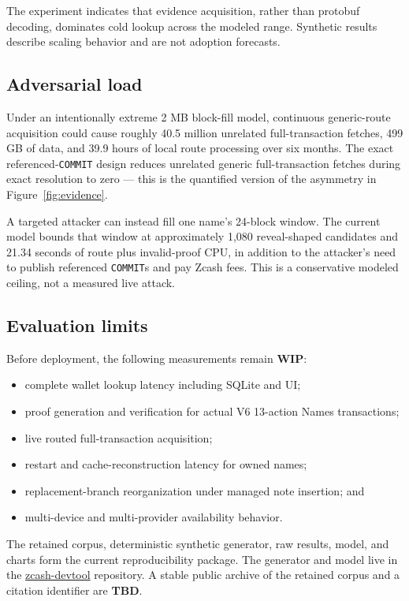 \documentclass[11pt]{article}
\newcommand{\operation}[1]{\texttt{#1}}
\newcommand{\statusword}[1]{\textbf{#1}}
\begin{document}
The experiment indicates that evidence acquisition, rather than protobuf
decoding, dominates cold lookup across the modeled range. Synthetic results
describe scaling behavior and are not adoption forecasts.

\subsection{Adversarial load}

Under an intentionally extreme 2 MB block-fill model, continuous
generic-route acquisition could cause roughly 40.5 million unrelated
full-transaction fetches, 499 GB of data, and 39.9 hours of local route
processing over six months. The exact referenced-\operation{COMMIT} design
reduces unrelated generic full-transaction fetches during exact resolution to
zero --- this is the quantified version of the asymmetry in
Figure~\ref{fig:evidence}.

A targeted attacker can instead fill one name's 24-block window. The current
model bounds that window at approximately 1,080 reveal-shaped candidates and
21.34 seconds of route plus invalid-proof CPU, in addition to the attacker's
need to publish referenced \operation{COMMIT}s and pay Zcash fees. This is a
conservative modeled ceiling, not a measured live attack.

\subsection{Evaluation limits}

Before deployment, the following measurements remain \statusword{WIP}:

\begin{itemize}
\item complete wallet lookup latency including SQLite and UI;
\item proof generation and verification for actual V6 13-action Names
transactions;
\item live routed full-transaction acquisition;
\item restart and cache-reconstruction latency for owned names;
\item replacement-branch reorganization under managed note insertion; and
\item multi-device and multi-provider availability behavior.
\end{itemize}

The retained corpus, deterministic synthetic generator, raw results, model,
and charts form the current reproducibility package. The generator and model
live in the \href{https://github.com/nfl0/zcash-devtool}{zcash-devtool}
repository. A stable public archive of the retained corpus and a citation
identifier are \statusword{TBD}.
\end{document}
